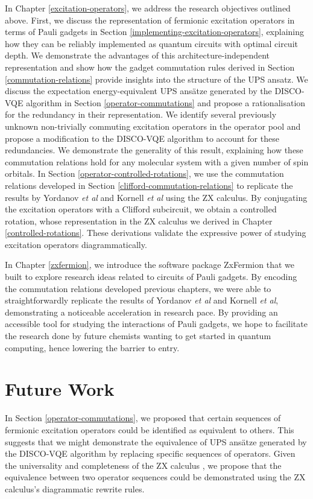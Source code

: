 In Chapter \ref{excitation-operators}, we address the research objectives outlined above. First, we discuss the representation of fermionic excitation operators in terms of Pauli gadgets in Section \ref{implementing-excitation-operators}, explaining how they can be reliably implemented as quantum circuits with optimal circuit depth. We demonstrate the advantages of this architecture-independent representation and show how the gadget commutation rules derived in Section \ref{commutation-relations} provide insights into the structure of the UPS ansatz. We discuss the expectation energy-equivalent UPS ansätze generated by the DISCO-VQE algorithm in Section \ref{operator-commutations} and propose a rationalisation for the redundancy in their representation. We identify several previously unknown non-trivially commuting excitation operators in the operator pool and propose a modification to the DISCO-VQE algorithm to account for these redundancies. We demonstrate the generality of this result, explaining how these commutation relations hold for any molecular system with a given number of spin orbitals. In Section \ref{operator-controlled-rotations}, we use the commutation relations developed in Section \ref{clifford-commutation-relations} to replicate the results by Yordanov \textit{et al} and Kornell \textit{et al} using the ZX calculus. By conjugating the excitation operators with a Clifford subcircuit, we obtain a controlled rotation, whose representation in the ZX calculus we derived in Chapter \ref{controlled-rotations}. These derivations validate the expressive power of studying excitation operators diagrammatically.

In Chapter \ref{zxfermion}, we introduce the software package ZxFermion that we built to explore research ideas related to circuits of Pauli gadgets. By encoding the commutation relations developed previous chapters, we were able to straightforwardly replicate the results of Yordanov \textit{et al} and Kornell \textit{et al}, demonstrating a noticeable acceleration in research pace. By providing an accessible tool for studying the interactions of Pauli gadgets, we hope to facilitate the research done by future chemists wanting to get started in quantum computing, hence lowering the barrier to entry.

\section{Future Work}

In Section \ref{operator-commutations}, we proposed that certain sequences of fermionic excitation operators could be identified as equivalent to others. This suggests that we might demonstrate the equivalence of UPS ansätze generated by the DISCO-VQE algorithm by replacing specific sequences of operators. Given the universality and completeness of the ZX calculus \cite{Coecke2011}, we propose that the equivalence between two operator sequences could be demonstrated using the ZX calculus's diagrammatic rewrite rules.

